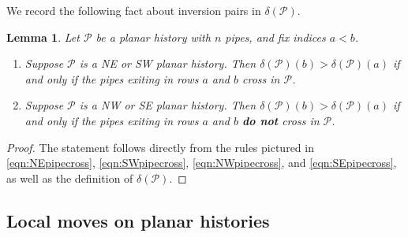 \documentclass[12 pt]{amsart}
\newtheorem{lemma}[Theorem]{Lemma}
\numberwithin{equation}{section}
\theoremstyle{remark}
\newcommand{\demprod}{\delta}
\begin{document}
	We record the following fact about inversion pairs in $\demprod(\mathcal{P})$.
	\begin{lemma}
		\label{lemma:planarhistoryinversions}
		Let $\mathcal{P}$ be a planar history with $n$ pipes, and fix indices $a<b$.
		\begin{enumerate}
			\item Suppose $\mathcal{P}$ is a NE or SW planar history.
			Then $\demprod(\mathcal{P})(b) > \demprod(\mathcal{P})(a)$ if and only if the pipes exiting in rows $a$ and $b$ cross in $\mathcal{P}$.
			\item Suppose $\mathcal{P}$ is a NW or SE planar history.
			Then $\demprod(\mathcal{P})(b)>\demprod(\mathcal{P})(a)$ if and only if the pipes exiting in rows $a$ and $b$ {\bf do not} cross in $\mathcal{P}$.
		\end{enumerate}
	\end{lemma}
	\begin{proof}
		The statement follows directly from the rules pictured in \cref{eqn:NEpipecross}, \cref{eqn:SWpipecross}, \cref{eqn:NWpipecross}, and \cref{eqn:SEpipecross}, as well as the definition of $\demprod(\mathcal{P})$.
	\end{proof}
	
	\subsection{Local moves on planar histories}
	
\end{document}
